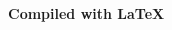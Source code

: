 \documentclass[12pt]{article}
\begin{document}
\begin{CJK}{UTF8}{min}

	\vfill
	\begin{center}
		\textbf{\Huge Compiled with \LaTeX}
	\end{center}
\end{CJK}
\end{document}
